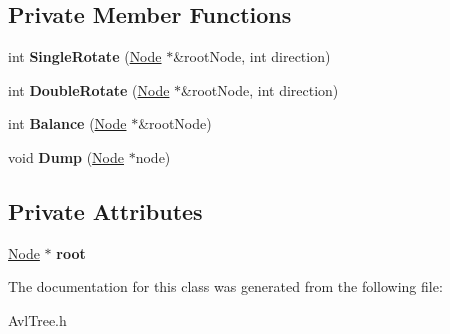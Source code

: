 \subsection*{Private Member Functions}
\begin{DoxyCompactItemize}
\item 
\hypertarget{classAVLTree_ac7ebd1be164c8e1d0eab990e14285957}{int {\bfseries Single\-Rotate} (\hyperlink{structAVLTree_1_1Node}{Node} $\ast$\&root\-Node, int direction)}\label{classAVLTree_ac7ebd1be164c8e1d0eab990e14285957}

\item 
\hypertarget{classAVLTree_a7e2ed1a8d70f97fc9d4de6d9da4eb729}{int {\bfseries Double\-Rotate} (\hyperlink{structAVLTree_1_1Node}{Node} $\ast$\&root\-Node, int direction)}\label{classAVLTree_a7e2ed1a8d70f97fc9d4de6d9da4eb729}

\item 
\hypertarget{classAVLTree_aabcb2e90d12bcb172f728692bce7e7be}{int {\bfseries Balance} (\hyperlink{structAVLTree_1_1Node}{Node} $\ast$\&root\-Node)}\label{classAVLTree_aabcb2e90d12bcb172f728692bce7e7be}

\item 
\hypertarget{classAVLTree_aeafa2839058227c9a076d56d7929ebf7}{void {\bfseries Dump} (\hyperlink{structAVLTree_1_1Node}{Node} $\ast$node)}\label{classAVLTree_aeafa2839058227c9a076d56d7929ebf7}

\end{DoxyCompactItemize}
\subsection*{Private Attributes}
\begin{DoxyCompactItemize}
\item 
\hypertarget{classAVLTree_a260b2a142458745acb90c685fc603c95}{\hyperlink{structAVLTree_1_1Node}{Node} $\ast$ {\bfseries root}}\label{classAVLTree_a260b2a142458745acb90c685fc603c95}

\end{DoxyCompactItemize}


The documentation for this class was generated from the following file\-:\begin{DoxyCompactItemize}
\item 
Avl\-Tree.\-h\end{DoxyCompactItemize}
